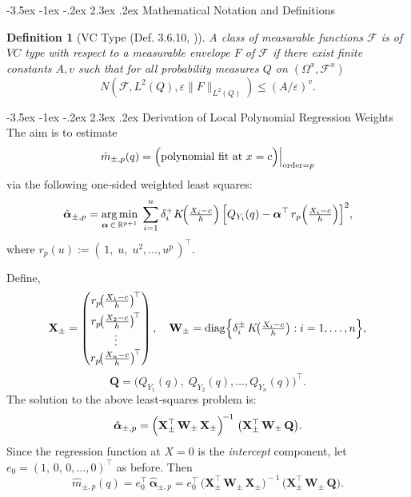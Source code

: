 \documentclass[12pt]{article}
\makeatletter
\renewcommand\section{\@startsection{section}{1}{\z@}%
  {-3.5ex \@plus -1ex \@minus -.2ex}%
  {2.3ex \@plus.2ex}%
  {\bfseries\large\center}} %
\newtheorem{definition}{Definition}
\makeatother
\begin{document}
\section{Mathematical Notation and Definitions}

\begin{definition}[VC Type (Def. 3.6.10, \cite{gine2021mathematical})]
A class of measurable functions $\mathcal{F}$ is of $VC$ type with respect to a measurable envelope $F$ of $\mathcal{F}$ if there exist finite constants $A, v$ such that for all probability measures $Q$ on $(\Omega^x, \mathcal{F}^x)$
$$
N\left(\mathcal{F}, L^2(Q), \varepsilon\|F\|_{L^2(Q)}\right) \leq(A / \varepsilon)^v .
$$
\end{definition}

\section{Derivation of Local Polynomial Regression Weights} \label{sec_app:poly_weights}
The aim is to estimate
\[
  \hat{m}_{\pm,p}(q) =
  \Bigl.\Bigl(\text{polynomial fit at }x = c\Bigr)\Bigr|_{\text{order}=p}
\]
via the following one‐sided weighted least squares:
\[
  \hat{\boldsymbol{\alpha}}_{\pm,p}
  =
  \underset{\boldsymbol{\alpha}\,\in\,\mathbb{R}^{p+1}}{\arg\min}
  \;\sum_{i=1}^{n}
   \delta^+_i 
    K\!\Bigl(\tfrac{X_{i}-c}{h}\Bigr)\,\Bigl[
      Q_{Y_i}(q)-\boldsymbol{\alpha}^\top\,r_{p}\Bigl(\tfrac{X_{i}-c}{h}\Bigr)
    \Bigr]^2,
\]
where \(r_{p}(u) := (\,1,\;u,\;u^{2},\dots,u^{p}\,)^\top\).


Define,
\[
  \mathbf{X}_{\pm}
  =
  \begin{pmatrix}
    r_{p}\!\bigl(\tfrac{X_{1}-c}{h}\bigr)^{\!\top}\\[4pt]
    r_{p}\!\bigl(\tfrac{X_{2}-c}{h}\bigr)^{\!\top}\\
    \vdots\\
    r_{p}\!\bigl(\tfrac{X_{n}-c}{h}\bigr)^{\!\top}
  \end{pmatrix}
  ,\quad
  \mathbf{W}_{\pm} = \mathrm{diag}\Bigl\{ \delta_i^\pm\,K\!\bigl(\tfrac{X_{i}-c}{h}\bigr)
     : i=1,\dots,n
  \Bigr\},
\]
\[
  \mathbf{Q}
  =
  \bigl(Q_{Y_1}(q),\;Q_{Y_2}(q),\dots,Q_{Y_n}(q)\bigr)^\top.
\]
The solution to the above least‐squares problem is:
\[
  \hat{\boldsymbol{\alpha}}_{\pm,p}
  =
  \Bigl(
    \mathbf{X}_{\pm}^\top\,\mathbf{W}_{\pm}\,\mathbf{X}_{\pm}
  \Bigr)^{\!-1}
  \;\bigl(\mathbf{X}_{\pm}^\top\,\mathbf{W}_{\pm}\,\mathbf{Q}\bigr).
\]
Since the regression function at \(X=0\) is the \emph{intercept} component, let
\(e_{0}=(1,\,0,\,0,\dots,0)^\top\) as before.  Then
\[
  \hat{m}_{\pm,p}(q)
  =
  e_{0}^{\!\top}\,\hat{\boldsymbol{\alpha}}_{\pm,p}
  =
 e_{0}^{\!\top}
  \,\bigl(
    \mathbf{X}_{\pm}^\top\,\mathbf{W}_{\pm}\,\mathbf{X}_{\pm}
  \bigr)^{\!-1}
  \,\bigl(\mathbf{X}_{\pm}^\top\,\mathbf{W}_{\pm}\,\mathbf{Q}\bigr).
\]
\end{document}
